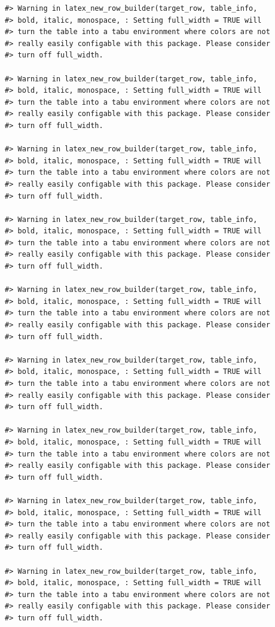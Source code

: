 \documentclass[
]{book}
\begin{document}
\begin{verbatim}
#> Warning in latex_new_row_builder(target_row, table_info,
#> bold, italic, monospace, : Setting full_width = TRUE will
#> turn the table into a tabu environment where colors are not
#> really easily configable with this package. Please consider
#> turn off full_width.

#> Warning in latex_new_row_builder(target_row, table_info,
#> bold, italic, monospace, : Setting full_width = TRUE will
#> turn the table into a tabu environment where colors are not
#> really easily configable with this package. Please consider
#> turn off full_width.

#> Warning in latex_new_row_builder(target_row, table_info,
#> bold, italic, monospace, : Setting full_width = TRUE will
#> turn the table into a tabu environment where colors are not
#> really easily configable with this package. Please consider
#> turn off full_width.

#> Warning in latex_new_row_builder(target_row, table_info,
#> bold, italic, monospace, : Setting full_width = TRUE will
#> turn the table into a tabu environment where colors are not
#> really easily configable with this package. Please consider
#> turn off full_width.

#> Warning in latex_new_row_builder(target_row, table_info,
#> bold, italic, monospace, : Setting full_width = TRUE will
#> turn the table into a tabu environment where colors are not
#> really easily configable with this package. Please consider
#> turn off full_width.

#> Warning in latex_new_row_builder(target_row, table_info,
#> bold, italic, monospace, : Setting full_width = TRUE will
#> turn the table into a tabu environment where colors are not
#> really easily configable with this package. Please consider
#> turn off full_width.

#> Warning in latex_new_row_builder(target_row, table_info,
#> bold, italic, monospace, : Setting full_width = TRUE will
#> turn the table into a tabu environment where colors are not
#> really easily configable with this package. Please consider
#> turn off full_width.

#> Warning in latex_new_row_builder(target_row, table_info,
#> bold, italic, monospace, : Setting full_width = TRUE will
#> turn the table into a tabu environment where colors are not
#> really easily configable with this package. Please consider
#> turn off full_width.

#> Warning in latex_new_row_builder(target_row, table_info,
#> bold, italic, monospace, : Setting full_width = TRUE will
#> turn the table into a tabu environment where colors are not
#> really easily configable with this package. Please consider
#> turn off full_width.
\end{verbatim}
\end{document}

